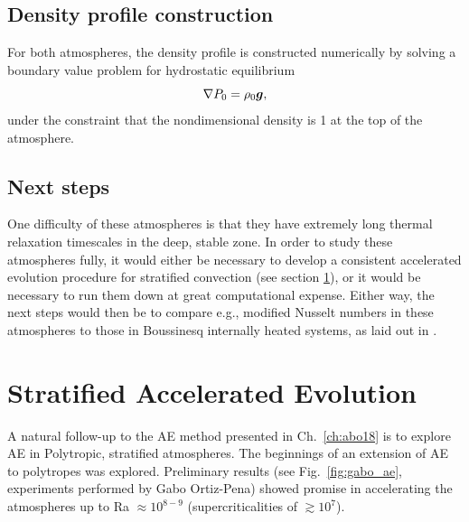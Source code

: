 \subsection{Density profile construction}
For both atmospheres, the density profile is constructed numerically by solving a boundary value problem for hydrostatic equilibrium
\begin{equation}
\nabla P_0 = \rho_0 \bm{g},
\end{equation}
under the constraint that the nondimensional density is 1 at the top of the atmosphere.

\subsection{Next steps}
One difficulty of these atmospheres is that they have extremely long thermal relaxation timescales in the deep, stable zone.
In order to study these atmospheres fully, it would either be necessary to develop a consistent accelerated evolution procedure for stratified convection (see section \ref{sec:stratified_ae}), or it would be necessary to run them down at great computational expense.
Either way, the next steps would then be to compare e.g., modified Nusselt numbers in these atmospheres to those in Boussinesq internally heated systems, as laid out in \citet{goluskin2016}.


\section{Stratified Accelerated Evolution}
\label{sec:stratified_ae}
A natural follow-up to the AE method presented in Ch.~\ref{ch:abo18} is to explore AE in Polytropic, stratified atmospheres.
The beginnings of an extension of AE to polytropes was explored.
Preliminary results (see Fig.~\ref{fig:gabo_ae}, experiments performed by Gabo Ortiz-Pena) showed promise in accelerating the atmospheres up to Ra $\approx 10^{8-9}$ (supercriticalities of $\gtrsim 10^7$).


